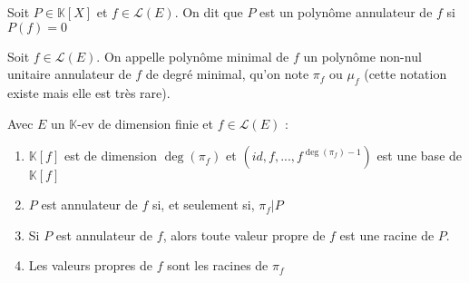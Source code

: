 \documentclass[a4paper,12pt]{book}
\newcommand{\Def}[2]{\begin{tcolorbox}[sharp corners, colback=white,colframe=blue!90!black!75, title=Définition : #1]#2\end{tcolorbox}}
\newcommand{\Prop}[2]{\begin{tcolorbox}[sharp corners, colback=white,colframe=red!90!black!75, title=Proposition : #1]#2\end{tcolorbox}}
\def\K{\mathbb{K}}
\begin{document}
\Def{Polynôme annulateur}{Soit $P\in\K[X]$ et $f\in\mathcal{L}(E)$. On dit que $P$ est un polynôme annulateur de $f$ si $P(f)=0$}
\Def{Polynôme minimal}{Soit $f\in\mathcal{L}(E)$. On appelle polynôme minimal de $f$ un polynôme non-nul unitaire annulateur de $f$ de degré minimal, qu'on note $\pi_f$ ou $\mu_f$ (cette notation existe mais elle est très rare).}
\Prop{}{Avec $E$ un $\K$-ev de dimension finie et $f\in\mathcal{L}(E)$ : \begin{enumerate}
\item $\K[f]$ est de dimension $\deg (\pi_f)$ et $(id,f,..., f^{\deg(\pi_f)-1})$ est une base de $\K[f]$
\item $P$ est annulateur de $f$ si, et seulement si, $\pi_f\vert P$
\item Si $P$ est annulateur de $f$, alors toute valeur propre de $f$ est une racine de $P$.
\item Les valeurs propres de $f$ sont les racines de $\pi_f$
\end{enumerate}}
\end{document}
